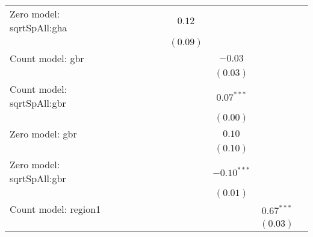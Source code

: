 \begin{table}
\begin{center}
{\begin{tabular}{l c c c c c c c c c}
Zero model: sqrtSpAll:gha      &                &                &               &               &               & $0.12$          &               &               &                 \\
                               &                &                &               &               &               & $(0.09)$        &               &               &                 \\
Count model: gbr               &                &                &               &               &               &                 & $-0.03$       &               &                 \\
                               &                &                &               &               &               &                 & $(0.03)$      &               &                 \\
Count model: sqrtSpAll:gbr     &                &                &               &               &               &                 & $0.07^{***}$  &               &                 \\
                               &                &                &               &               &               &                 & $(0.00)$      &               &                 \\
Zero model: gbr                &                &                &               &               &               &                 & $0.10$        &               &                 \\
                               &                &                &               &               &               &                 & $(0.10)$      &               &                 \\
Zero model: sqrtSpAll:gbr      &                &                &               &               &               &                 & $-0.10^{***}$ &               &                 \\
                               &                &                &               &               &               &                 & $(0.01)$      &               &                 \\
Count model: region1           &                &                &               &               &               &                 &               & $0.67^{***}$  &                 \\
                               &                &                &               &               &               &                 &               & $(0.03)$      &                 \\

\end{tabular}}
\end{center}
\end{table}
